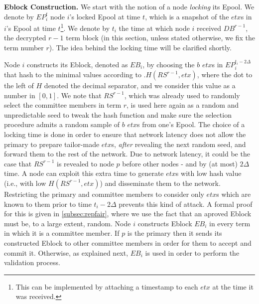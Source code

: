 
\textbf{Eblock Construction.} We start with the notion of a node \emph{locking} its Epool. We denote by $EP_i^t$ node $i$'s locked Epool at time $t$, which is a snapshot of the $etx$s in $i$'s Epool at time $t$\footnote{This can be implemented by attaching a timestamp to each $etx$ at the time it was received.}.  We denote by $t_i$ the time at which node $i$ received $DB^{r-1}$, the decrypted $r-1$ term block (in this section, unless stated otherwise, we fix the term number $r$). The idea behind the locking time will be clarified shortly.

Node $i$ constructs its Eblock, denoted as $EB_i$, by choosing the $b$ $etx$s in $EP_i^{t_i-2\Delta}$ that hash to the minimal values according to $.H(RS^{r-1},etx)$, where the dot to the left of $H$ denoted the decimal separator, and we consider this value as a number in $[0,1]$. We note that $RS^{r-1}$, which was already used to randomly select the committee members in term $r$, is used here again as a random and unpredictable seed to tweak the hash function and make sure the selection procedure admits a random sample of $b$ $etx$s from one's Epool. 
The choice of a locking time is done in order to ensure that network latency does not allow the primary to prepare tailor-made $etx$s, \emph{after} revealing the next random seed, and forward them to the rest of the network.  
Due to network latency, it could be the case that $RS^{r-1}$ is revealed to node $p$ before other nodes - and by (at most) $2\Delta$ time. A node can exploit this extra time to generate $etx$s with low hash value (i.e., with low $H(RS^{r-1},etx)$) and disseminate them to the network. Restricting the primary and committee members to consider only $etx$s which are known to them prior to time $t_i-2\Delta$ prevents this kind of attack. A formal proof for this is given in \ref{subsec:repfair}, where we use the fact that an aproved Eblock must be, to a large extent, random. 
Node $i$ constructs Eblock $EB_i$ in every term in which it is a committee member. If $p$ is the primary then it sends its constructed Eblock to other committee members in order for them to accept and commit it. Otherwise, as explained next, $EB_i$ is used in order to perform the validation process. 


